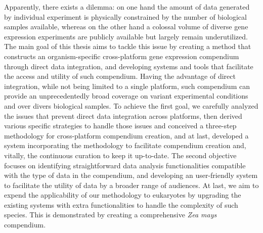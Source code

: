 

Apparently, there exists a dilemma: on one hand the amount of data generated by
individual experiment is physically constrained by the number of biological
samples available, whereas on the other hand a colossal volume of diverse gene
expression experiments are publicly available but largely remain underutilized.
%
The main goal of this thesis aims to tackle this issue by creating a method
that constructs an organism-specific cross-platform gene expression compendium
through direct data integration, and developing systems and tools that
facilitate the access and utility of such compendium.
%
Having the advantage of direct integration, while not being limited to a single
platform, such compendium can provide an unprecedentedly broad coverage on
variant experimental conditions and over divers biological samples.
%
To achieve the first goal, we carefully analyzed the issues that prevent direct
data integration across platforms, then derived various specific strategies to
handle those issues and conceived a three-step methodology for cross-platform
compendium creation, and at last, developed a system incorporating the
methodology to facilitate compendium creation and, vitally, the continuous
curation to keep it up-to-date.
%
The second objective focuses on identifying straightforward data analysis
functionalities compatible with the type of data in the compendium, and
developing an user-friendly system to facilitate the utility of data by a
broader range of audiences.
%
At last, we aim to expend the applicability of our methodology to eukaryotes by
upgrading the existing systems with extra functionalities to handle the
complexity of such species.
%
This is demonstrated by creating a comprehensive \textit{Zea mays} compendium.


